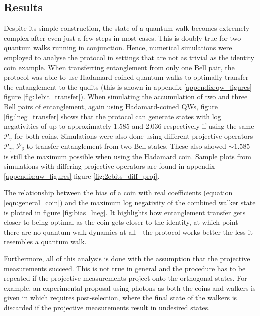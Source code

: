 \subsection{Results}
\label{subsection:results}
Despite its simple construction, the state of a quantum walk becomes extremely complex after even just a few steps in most cases.
This is doubly true for two quantum walks running in conjunction.
Hence, numerical simulations were employed to analyse the protocol in settings that are not as trivial as the identity coin example.
When transferring entanglement from only one Bell pair, the protocol was able to use Hadamard-coined quantum walks to optimally transfer the entanglement to the qudits (this is shown in appendix \ref{appendix:qw_figures} figure \ref{fig:1ebit_transfer}).
When simulating the accumulation of two and three Bell pairs of entanglement, again using Hadamard-coined QWs, figure \ref{fig:lneg_transfer} shows that the protocol can generate states with log negativities of up to approximately 1.585 and 2.036 respectively if using the same $\mathcal{P}_\gamma$ for both coins.
Simulations were also done using different projective operators $\mathcal{P}_\gamma$, $\mathcal{P}_\delta$ to transfer entanglement from two Bell states.
These also showed $\sim 1.585$ is still the maximum possible when using the Hadamard coin.
Sample plots from simulations with differing projective operators are found in appendix \ref{appendix:qw_figures} figure \ref{fig:2ebits_diff_proj}.

The relationship between the bias of a coin with real coefficients (equation \ref{eqn:general_coin}) and the maximum log negativity of the combined walker state is plotted in figure \ref{fig:bias_lneg}.
It highlights how entanglement transfer gets closer to being optimal as the coin gets closer to the identity, at which point there are no quantum walk dynamics at all - the protocol works better the less it resembles a quantum walk.

Furthermore, all of this analysis is done with the assumption that the projective measurements succeed.
This is not true in general and the procedure has to be repeated if the projective measurements project onto the orthogonal states.
For example, an experimental proposal using photons as both the coins and walkers is given in \cite{giordani2020} which requires post-selection, where the final state of the walkers is discarded if the projective measurements result in undesired states.

